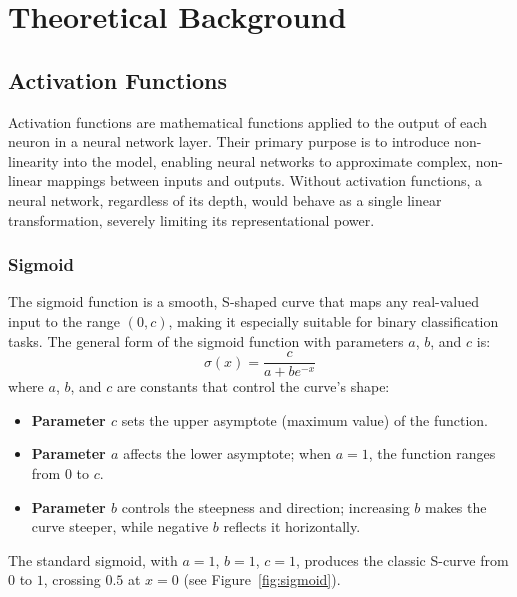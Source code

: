 \documentclass[a4paper, journal]{IEEEtran}
\begin{document}


\section{Theoretical Background}

\subsection{Activation Functions}
Activation functions are mathematical functions applied to the output of each neuron in a neural network layer. Their primary purpose is to introduce non-linearity into the model, enabling neural networks to approximate complex, non-linear mappings between inputs and outputs. Without activation functions, a neural network, regardless of its depth, would behave as a single linear transformation, severely limiting its representational power. \\

\subsubsection{Sigmoid}
The sigmoid function is a smooth, S-shaped curve that maps any real-valued input to the range $(0, c)$, making it especially suitable for binary classification tasks. The general form of the sigmoid function with parameters $a$, $b$, and $c$ is:
\begin{equation}
    \sigma(x) = \frac{c}{a + be^{-x}}
\end{equation}
where $a$, $b$, and $c$ are constants that control the curve's shape:

\begin{itemize}
    \item \textbf{Parameter $c$} sets the upper asymptote (maximum value) of the function.
    \item \textbf{Parameter $a$} affects the lower asymptote; when $a=1$, the function ranges from $0$ to $c$.
    \item \textbf{Parameter $b$} controls the steepness and direction; increasing $b$ makes the curve steeper, while negative $b$ reflects it horizontally.
\end{itemize}

The standard sigmoid, with $a=1$, $b=1$, $c=1$, produces the classic S-curve from $0$ to $1$, crossing $0.5$ at $x=0$ (see Figure~\ref{fig:sigmoid}).
\end{document}
